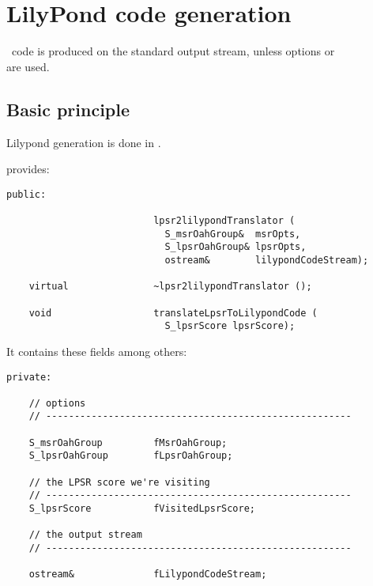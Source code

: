 
\chapter{LilyPond code generation}


\lily\ code is produced on the standard output stream, unless options  or \\
 are used.


\section{Basic principle}

Lilypond generation is done in .

 provides:
\begin{lstlisting}[language=CPlusPlus]
  public:

                          lpsr2lilypondTranslator (
                            S_msrOahGroup&  msrOpts,
                            S_lpsrOahGroup& lpsrOpts,
                            ostream&        lilypondCodeStream);

    virtual               ~lpsr2lilypondTranslator ();

    void                  translateLpsrToLilypondCode (
                            S_lpsrScore lpsrScore);
\end{lstlisting}

It contains these fields among others:
\begin{lstlisting}[language=CPlusPlus]
  private:

    // options
    // ------------------------------------------------------

    S_msrOahGroup         fMsrOahGroup;
    S_lpsrOahGroup        fLpsrOahGroup;

    // the LPSR score we're visiting
    // ------------------------------------------------------
    S_lpsrScore           fVisitedLpsrScore;

    // the output stream
    // ------------------------------------------------------

    ostream&              fLilypondCodeStream;
\end{lstlisting}


